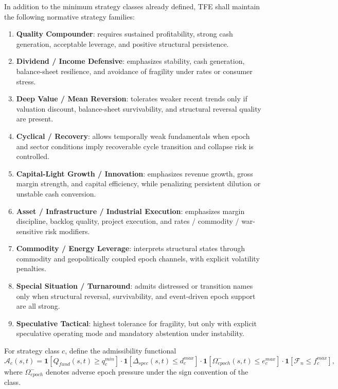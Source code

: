 \documentclass[11pt]{report}
\begin{document}
In addition to the minimum strategy classes already defined, TFE shall maintain the following normative strategy families:
\begin{enumerate}[leftmargin=1.2cm]
    \item \textbf{Quality Compounder}: requires sustained profitability, strong cash generation, acceptable leverage, and positive structural persistence.
    \item \textbf{Dividend / Income Defensive}: emphasizes stability, cash generation, balance-sheet resilience, and avoidance of fragility under rates or consumer stress.
    \item \textbf{Deep Value / Mean Reversion}: tolerates weaker recent trends only if valuation discount, balance-sheet survivability, and structural reversal quality are present.
    \item \textbf{Cyclical / Recovery}: allows temporally weak fundamentals when epoch and sector conditions imply recoverable cycle transition and collapse risk is controlled.
    \item \textbf{Capital-Light Growth / Innovation}: emphasizes revenue growth, gross margin strength, and capital efficiency, while penalizing persistent dilution or unstable cash conversion.
    \item \textbf{Asset / Infrastructure / Industrial Execution}: emphasizes margin discipline, backlog quality, project execution, and rates / commodity / war-sensitive risk modifiers.
    \item \textbf{Commodity / Energy Leverage}: interprets structural states through commodity and geopolitically coupled epoch channels, with explicit volatility penalties.
    \item \textbf{Special Situation / Turnaround}: admits distressed or transition names only when structural reversal, survivability, and event-driven epoch support are all strong.
    \item \textbf{Speculative Tactical}: highest tolerance for fragility, but only with explicit speculative operating mode and mandatory abstention under instability.
\end{enumerate}

For strategy class $c$, define the admissibility functional
\[
\mathcal{A}_c(s,t)=\mathbf{1}[Q_{fund}(s,t)\ge q_c^{min}]\cdot \mathbf{1}[\Delta_{spec}(s,t)\le d_c^{max}]\cdot \mathbf{1}[\Omega_{epoch}^{-}(s,t)\le e_c^{max}]\cdot \mathbf{1}[\mathcal{F}_n\le f_c^{max}],
\]
where $\Omega_{epoch}^{-}$ denotes adverse epoch pressure under the sign convention of the class.
\end{document}
